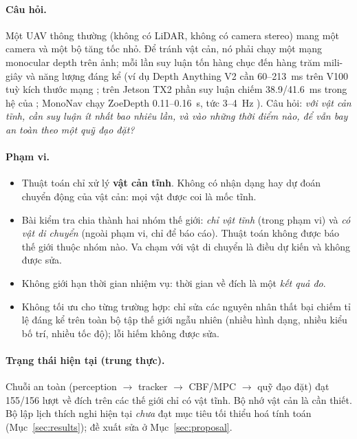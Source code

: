 \documentclass[11pt,a4paper]{article}
\numberwithin{equation}{section}
\theoremstyle{definition}
\theoremstyle{plain}
\theoremstyle{remark}
\begin{document}
\paragraph{Câu hỏi.} Một UAV thông thường (không có LiDAR, không có camera stereo) mang một camera và một bộ tăng tốc nhỏ. Để tránh vật cản, nó phải chạy một mạng monocular depth trên ảnh; mỗi lần suy luận tốn hàng chục đến hàng trăm mili-giây và năng lượng đáng kể (ví dụ Depth Anything V2 cần 60--213~ms trên V100 tuỳ kích thước mạng \cite{yang2024dav2}; trên Jetson TX2 phần suy luận chiếm 38.9/41.6~ms trong hệ của \cite{loquercio2021}; MonoNav chạy ZoeDepth 0.11--0.16~s, tức 3--4~Hz \cite{simon2023mononav}). Câu hỏi: \emph{với vật cản tĩnh, cần suy luận ít nhất bao nhiêu lần, và vào những thời điểm nào, để vẫn bay an toàn theo một quỹ đạo đặt?}

\paragraph{Phạm vi.}
\begin{itemize}
\item Thuật toán chỉ xử lý \textbf{vật cản tĩnh}. Không có nhận dạng hay dự đoán chuyển động của vật cản: mọi vật được coi là mốc tĩnh.
\item Bài kiểm tra chia thành hai nhóm thế giới: \emph{chỉ vật tĩnh} (trong phạm vi) và \emph{có vật di chuyển} (ngoài phạm vi, chỉ để báo cáo). Thuật toán không được báo thế giới thuộc nhóm nào. Va chạm với vật di chuyển là điều dự kiến và không được sửa.
\item Không giới hạn thời gian nhiệm vụ: thời gian về đích là một \emph{kết quả đo}.
\item Không tối ưu cho từng trường hợp: chỉ sửa các nguyên nhân thất bại chiếm tỉ lệ đáng kể trên toàn bộ tập thế giới ngẫu nhiên (nhiều hình dạng, nhiều kiểu bố trí, nhiều tốc độ); lỗi hiếm không được sửa.
\end{itemize}

\paragraph{Trạng thái hiện tại (trung thực).} Chuỗi an toàn (perception $\to$ tracker $\to$ CBF/MPC $\to$ quỹ đạo đặt) đạt 155/156 lượt về đích trên các thế giới chỉ có vật tĩnh. Bộ nhớ vật cản là cần thiết. Bộ lập lịch thích nghi hiện tại \emph{chưa} đạt mục tiêu tối thiểu hoá tính toán (Mục~\ref{sec:results}); đề xuất sửa ở Mục~\ref{sec:proposal}.

\end{document}
